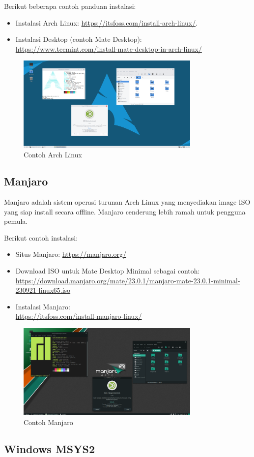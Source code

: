 \documentclass[12pt]{book}
\begin{document}
	Berikut beberapa contoh panduan instalasi:
	
	\begin{itemize}
		\item Instalasi Arch Linux: \url{https://itsfoss.com/install-arch-linux/}.
		
		\item Instalasi Desktop (contoh Mate Desktop): \\
		\url{https://www.tecmint.com/install-mate-desktop-in-arch-linux/}
	\end{itemize}
	
	\begin{figure}[!ht]
		\centering
		\includegraphics[width=0.8\textwidth]{images/os/archmate}
		\caption{Contoh Arch Linux}
	\end{figure}
	
	\newpage
	\subsection{Manjaro}
	
	Manjaro adalah sistem operasi turunan Arch Linux yang menyediakan image ISO yang siap install secara offline.
	Manjaro cenderung lebih ramah untuk pengguna pemula.
	
	Berikut contoh instalasi:
	
	\begin{itemize}
		\item Situs Manjaro: \url{https://manjaro.org/}
		
		\item Download ISO untuk Mate Desktop Minimal sebagai contoh: \\
		\url{https://download.manjaro.org/mate/23.0.1/manjaro-mate-23.0.1-minimal-230921-linux65.iso}
		
		\item Instalasi Manjaro: \\
		\url{https://itsfoss.com/install-manjaro-linux/}
	\end{itemize}
	
	\begin{figure}[!ht]
		\centering
		\includegraphics[width=0.8\textwidth]{images/os/manjaro}
		\caption{Contoh Manjaro}
	\end{figure}
	
	\subsection{Windows MSYS2}
\end{document}
